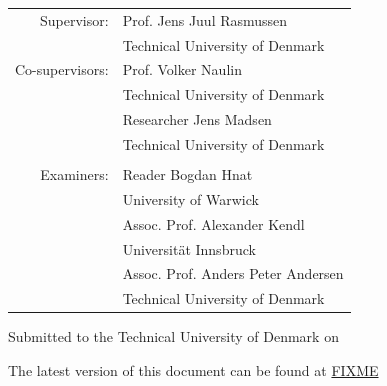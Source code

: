 \begin{titlepage}
\begin{center}
        \large
        {\def\arraystretch{1}\tabcolsep=10pt
        \begin{tabular}{rl}
        Supervisor:     & Prof. Jens Juul Rasmussen          \\ & Technical University of Denmark\\
        Co-supervisors: & Prof. Volker Naulin                \\ & Technical University of Denmark\\
                        & Researcher Jens Madsen             \\ & Technical University of Denmark\\
        &\\
        Examiners:      & Reader Bogdan Hnat                 \\ & University of Warwick\\
                        & Assoc. Prof. Alexander Kendl       \\ & Universit{\"a}t Innsbruck\\
                        & Assoc. Prof. Anders Peter Andersen \\ & Technical University of Denmark\\
        \end{tabular}
        }

        \vfill

        Submitted to the Technical University of Denmark on \thesisDate

        \vfill
        The latest version of this document can be found at \href{FIXME}{FIXME}
    \end{center}
\end{titlepage}
